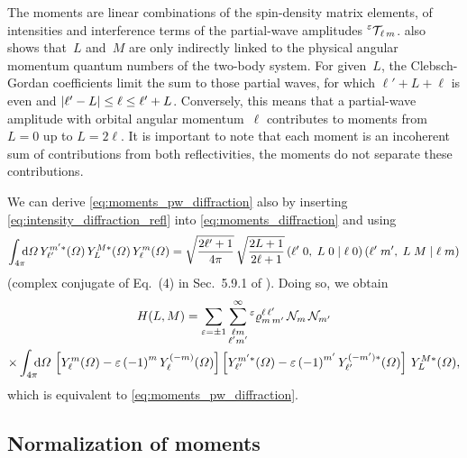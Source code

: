 The moments are linear combinations of the spin-density matrix
elements, \ie of intensities and interference terms of the
partial-wave amplitudes $\prescript{\ensuremath{\varepsilon}}{}{\mathcal{T\!}}_{\ell\,
m}$.   also shows that~$L$ and~$M$ are
only indirectly linked to the physical angular momentum quantum
numbers of the two-body system.  For given~$L$, the Clebsch-Gordan
coefficients limit the sum to those partial waves, for which $\ell' +
L + \ell$ is even and $\vert{\ell' - L}\vert \leq \ell \leq \ell' + L$.
Conversely, this means that a partial-wave amplitude with orbital
angular momentum~$\ell$ contributes to moments from $L = 0$ up to $L =
2 \ell$.  It is important to note that each moment is an incoherent
sum of contributions from both reflectivities, \ie the moments do not
separate these contributions.

We can derive \cref{eq:moments_pw_diffraction} also by inserting
\cref{eq:intensity_diffraction_refl} into
\cref{eq:moments_diffraction} and using
\begin{equation}
  \label{eq:spherical_harm_clebsch}
  \int_{4 \pi}\!\!\! \dif{\Omega}\,
  Y_{\ell'}^{m' *}(\Omega)\, Y_L^{M *}(\Omega)\, Y_{\ell}^m(\Omega)
  = \sqrt{\frac{2 \ell' + 1}{4 \pi}}\, \sqrt{\frac{2 L + 1}{2 \ell + 1}}\, \clebsch{\ell'}{0}{L}{0}{\ell}{0}\, \clebsch{\ell'}{m'}{L}{M}{\ell}{m}
\end{equation}
(complex conjugate of Eq.~(4) in Sec.~5.9.1 of
).  Doing so, we obtain
\begin{multline}
  \label{eq:moments_pw_diffraction_refl}
  H(L, M)
  = \sum_{\refl = \pm 1} \sum_{\substack{\ell m \\ \ell' m'}}^\infty
  \prescript{\refl}{}{\varrho}^{\ell\, \ell'}_{m\, m'}\,
  \mathcal{N}_m\, \mathcal{N}_{m'} \\
  \times \int_{4 \pi}\!\!\! \dif{\Omega}\,
  \sBrk[2]{Y_\ell^m(\Omega) - \refl\, {(-1)}^m\, Y_\ell^{(-m)}(\Omega)}
  \sBrk[2]{Y_{\ell'}^{m' *}(\Omega) - \refl\, {(-1)}^{m'}\, Y_{\ell'}^{(-m') *}(\Omega)}\,
  Y_L^{M *}(\Omega),
\end{multline}
which is equivalent to \cref{eq:moments_pw_diffraction}.


\subsection{Normalization of moments}%
\label{sec:diffraction:moments_norm}

